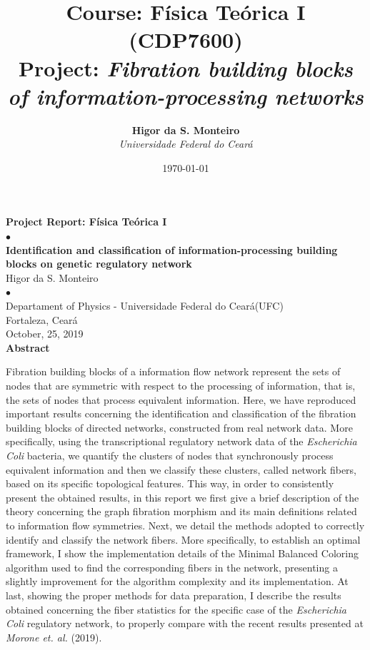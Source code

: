 \documentclass[12pt]{diazessay} %
\title{\textbf{Course: Física Teórica I (CDP7600)} \\[0.2cm] {\Large \textbf{Project}: \hspace{0.2cm}
\textit{Fibration building blocks of information-processing networks}
}}%
\author{\textbf{Higor da S. Monteiro} \\ \textit{Universidade Federal do Ceará}} %
\date{\today} %
\begin{document}

\begin{center}	
	{\LARGE \textbf{Project Report: Física Teórica I}}\\[0.25cm]
	{ $\bullet$ }\\
	\vspace{0.25cm}
	{\large \textbf{Identification and classification of information-processing building blocks on genetic regulatory network}}\\[0.25cm]
	{ Higor da S. Monteiro }\\
	{ $\bullet$ }\\
	{ Departament of Physics - Universidade Federal do Ceará(UFC) }\\
	{ Fortaleza, Ceará }\\
	{ October, 25, 2019 }\\[0.75cm]
	{\textbf{Abstract}}
	
\end{center}

Fibration building blocks of a information flow network represent the sets of nodes that are symmetric with respect to the processing of information, that is, the sets of nodes that process equivalent information. Here, we have reproduced important results concerning the identification and classification of the fibration building blocks of directed networks, constructed from real network data. More specifically, using the transcriptional regulatory network data of the \textit{Escherichia Coli} bacteria, we quantify the clusters of nodes that synchronously process equivalent information and then we classify these clusters, called network fibers, based on its specific topological features. This way, in order to consistently present the obtained results, in this report we first give a brief description of the theory concerning the graph fibration morphism and its main definitions related to information flow symmetries. Next, we detail the methods adopted to correctly identify and classify the network fibers. More specifically, to establish an optimal framework, I show the implementation details of the Minimal Balanced Coloring algorithm used to find the corresponding fibers in the network, presenting a slightly improvement for the algorithm complexity and its implementation. At last, showing the proper methods for data preparation, I describe the results obtained concerning the fiber statistics for the specific case of the \textit{Escherichia Coli} regulatory network, to properly compare with the recent results presented at \textit{Morone et. al.} (2019).
\end{document}
